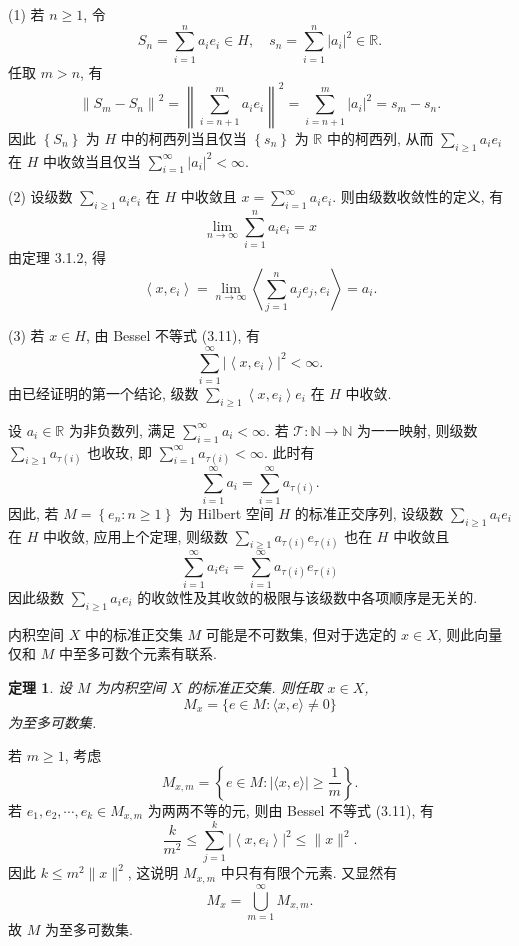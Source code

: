 \documentclass[openany]{ctexbook}
\makeatletter
\theoremstyle{kaiti}
\newtheorem{theorem}{定理}[section]
\theoremstyle{normal}
\renewenvironment{proof}[1][\proofname]{\par
    \pushQED{\qed}%
    \normalfont \topsep6\p@\@plus6\p@\relax
    \trivlist
    \item\relax
    {\heiti #1}\hspace{2\labelsep}\ignorespaces
  }{%
    \popQED\endtrivlist\@endpefalse
  }
\makeatother
\begin{document}
\begin{proof}
(1) 若 $n \geqslant 1$, 令
$$
S_n=\sum_{i=1}^n a_{i} e_{i} \in H, \quad s_n=\sum_{i=1}^n\left|a_{i}\right|^2 \in \mathbb{R}.
$$
任取 $m>n$, 有
$$
\left\|S_m-S_n\right\|^2=\left\|\sum_{i=n+1}^m a_{i} e_{i}\right\|^2=\sum_{i=n+1}^m\left|a_{i}\right|^2=s_m-s_n.
$$
因此 $\left\{S_n\right\}$ 为 $H$ 中的柯西列当且仅当 $\left\{s_n\right\}$ 为 $\mathbb{R}$ 中的柯西列, 从而 $\sum_{i \geqslant 1} a_{i} e_{i}$ 在 $H$ 中收敛当且仅当 $\sum_{i=1}^{\infty}\left|a_{i}\right|^2<\infty.$

(2) 设级数 $\sum_{i \geqslant 1} a_{i} e_{i}$ 在 $H$ 中收敛且 $x=\sum_{i=1}^{\infty} a_{i} e_{i}$. 则由级数收敛性的定义, 有
$$
\lim_{n \rightarrow \infty} \sum_{i=1}^n a_{i} e_{i}=x
$$
由定理 3.1.2, 得
$$
\left\langle x, e_{i}\right\rangle=\lim_{n \rightarrow \infty}\left\langle\sum_{j=1}^n a_{j} e_{j}, e_{i}\right\rangle=a_{i}.
$$

(3) 若 $x \in H$, 由 Bessel 不等式 (3.11), 有
$$
\sum_{i=1}^{\infty}\left|\left\langle x, e_{i}\right\rangle\right|^2<\infty.
$$
由已经证明的第一个结论, 级数 $\sum_{i \geqslant 1}\left\langle x, e_{i}\right\rangle e_{i}$ 在 $H$ 中收敛.
\end{proof}

设 $a_{i} \in \mathbb{R}$ 为非负数列, 满足 $\sum_{i=1}^{\infty} a_{i}<\infty$. 若 $\mathcal{T}: \mathbb{N} \rightarrow \mathbb{N}$ 为一一映射, 则级数 $\sum_{i \geqslant 1} a_{\tau(i)}$ 也收玫,
即 $\sum_{i=1}^{\infty} a_{\tau(i)}<\infty$. 此时有
$$
\sum_{i=1}^{\infty} a_{i}=\sum_{i=1}^{\infty} a_{\tau(i)}.
$$
因此, 若 $M=\left\{e_n: n \geqslant 1\right\}$ 为 Hilbert 空间 $H$ 的标准正交序列, 设级数 $\sum_{i \geqslant 1} a_{i} e_{i}$ 在 $H$ 中收敛, 应用上个定理, 则级数 $\sum_{i \geqslant 1} a_{\tau(i)} e_{\tau(i)}$ 也在 $H$ 中收敛且
$$
\sum_{i=1}^{\infty} a_{i} e_{i}=\sum_{i=1}^{\infty} a_{\tau(i)} e_{\tau(i)}
$$
因此级数 $\sum_{i \geqslant 1} a_{i} e_{i}$ 的收敛性及其收敛的极限与该级数中各项顺序是无关的.

内积空间 $X$ 中的标准正交集 $M$ 可能是不可数集, 但对于选定的 $x \in X$, 则此向量仅和 $M$ 中至多可数个元素有联系.

\begin{theorem}
设 $M$ 为内积空间 $X$ 的标准正交集. 则任取 $x \in X$,
$$
M_{x}=\{e \in M:\langle x, e\rangle \neq 0\}
$$
为至多可数集.
\end{theorem}

\begin{proof}
若 $m \geqslant 1$, 考虑
$$
M_{x, m}=\left\{e \in M:|\langle x, e\rangle| \geqslant \frac{1}{m}\right\}.
$$
若 $e_1, e_2, \cdots, e_{k} \in M_{x, m}$ 为两两不等的元, 则由 Bessel 不等式 (3.11), 有
$$
\frac{k}{m^2} \leqslant \sum_{j=1}^{k}\left|\left\langle x, e_{i}\right\rangle\right|^2 \leqslant\|x\|^2.
$$
因此 $k \leqslant m^2\|x\|^2$, 这说明 $M_{x, m}$ 中只有有限个元素. 又显然有
$$
M_{x}=\bigcup_{m=1}^{\infty} M_{x, m}.
$$
故 $M$ 为至多可数集.
\end{proof}
\end{document}
